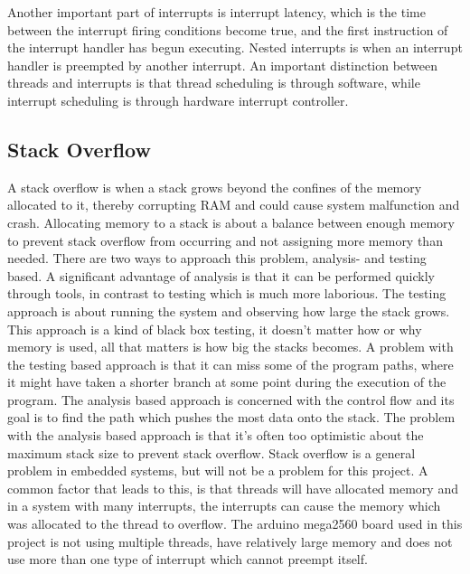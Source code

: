 Another important part of interrupts is interrupt latency, which is the time between the interrupt firing conditions become true, and the first instruction of the interrupt handler has begun executing. Nested interrupts is when an interrupt handler is preempted by another interrupt. An important distinction between threads and interrupts is that thread scheduling is through software, while interrupt scheduling is through hardware interrupt controller\citep{safe}.

\subsection{Stack Overflow}
\label{sec:Stack Overflow}
A stack overflow is when a stack grows beyond the confines of the memory allocated to it, thereby corrupting RAM and could cause system malfunction and crash\citep{safe}. Allocating memory to a stack is about a balance between enough memory to prevent stack overflow from occurring and not assigning more memory than needed. There are two ways to approach this problem, analysis- and testing based. A significant advantage of analysis is that it can be performed quickly through tools, in contrast to testing which is much more laborious. \newline
The testing approach is about running the system and observing how large the stack grows\citep{safe}. This approach is a kind of black box testing, it doesn’t matter how or why memory is used, all that matters is how big the stacks becomes. A problem with the testing based approach is that it can miss some of the program paths, where it might have taken a shorter branch at some point during the execution of the program. \newline
The analysis based approach is concerned with the control flow and its goal is to find the path which pushes the most data onto the stack. The problem with the analysis based approach is that it's often too optimistic about the maximum stack size to prevent stack overflow. \newline
Stack overflow is a general problem in embedded systems, but will not be a problem for this project. A common factor that leads to this, is that threads will have allocated memory and in a system with many interrupts, the interrupts can cause the memory which was allocated to the thread to overflow. The arduino mega2560 board used in this project is not using multiple threads, have relatively large memory and does not use more than one type of interrupt which cannot preempt itself. 

